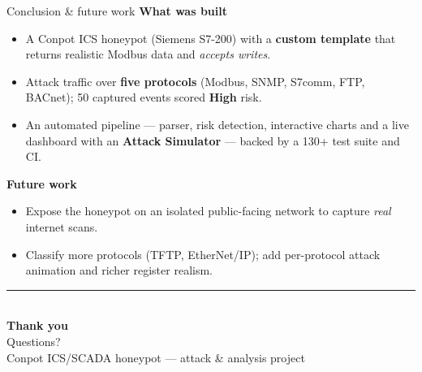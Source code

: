 \documentclass[aspectratio=169,11pt]{beamer}
\newcommand{\high}{\textcolor{hpred}{\textbf{High}}}
\begin{document}
\begin{frame}{Conclusion \& future work}
  \textbf{What was built}
  \begin{itemize}
    \item A Conpot ICS honeypot (Siemens S7-200) with a \textbf{custom template} that returns
          realistic Modbus data and \emph{accepts writes}.
    \item Attack traffic over \textbf{five protocols} (Modbus, SNMP, S7comm, FTP, BACnet);
          50 captured events scored \high{} risk.
    \item An automated pipeline --- parser, risk detection, interactive charts and a live
          dashboard with an \textbf{Attack Simulator} --- backed by a 130+ test suite and CI.
  \end{itemize}
  \vfill
  \textbf{Future work}
  \begin{itemize}
    \item Expose the honeypot on an isolated public-facing network to capture \emph{real}
          internet scans.
    \item Classify more protocols (TFTP, EtherNet/IP); add per-protocol attack animation and
          richer register realism.
  \end{itemize}
\end{frame}

\begin{frame}[plain]
  \vfill
  \begin{center}
    {\color{hpcyan}\rule{4cm}{1.5pt}}\\[1em]
    {\Huge\textbf{\color{ink}Thank you}}\\[0.8em]
    {\large\color{hpmuted}Questions?}\\[2em]
    {\footnotesize\color{hpmuted}Conpot ICS/SCADA honeypot --- attack \& analysis project}
  \end{center}
  \vfill
\end{frame}
\end{document}
